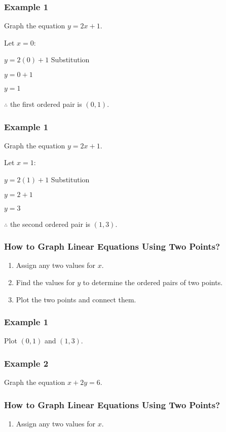 \documentclass[14pt]{beamer}
\begin{document}
    \begin{frame}
    	\frametitle{Example 1}
    	Graph the equation $ y = 2x + 1 $.
    	
    	\vone Let $ x = 0: $
    	
    	\vone \pause $ y = 2(0) + 1 $ \pause \void Substitution
    	
    	\pause \vone $ y = 0 + 1 $
    	
    	\pause \vone $ y = 1 $
    	
    	\pause \vone $ \therefore $ the first ordered pair is $ (0, 1) $.
    \end{frame}

    \begin{frame}
    	\frametitle{Example 1}
    	Graph the equation $ y = 2x + 1 $.
    	
    	\vone Let $ x = 1: $
    	
    	\vone \pause $ y = 2(1) + 1 $ \pause \void Substitution
    	
    	\pause \vone $ y = 2 + 1 $
    	
    	\pause \vone $ y = 3 $
    	
    	\pause \vone $ \therefore $ the second ordered pair is $ (1, 3) $.
    \end{frame}

   \begin{frame}
   	\frametitle{How to Graph Linear Equations Using Two Points?}
   	\begin{enumerate}  
   		\item Assign any two values for $ x $.
   		\item Find the values for $ y $ to determine the ordered pairs of two points.
   		\item Plot the two points and connect them.
   	\end{enumerate}  
   \end{frame}

    \begin{frame}
    	\frametitle{Example 1}
    	Plot $ (0, 1) $ and $ (1, 3) $.
    \end{frame}

    \begin{frame}
    	\frametitle{Example 2}
    	Graph the equation $ x + 2y = 6 $.
    \end{frame}
    
    \begin{frame}
    	\frametitle{How to Graph Linear Equations Using Two Points?}
    	\begin{enumerate}  
    		\item Assign any two values for $ x $.
    	\end{enumerate}  
    \end{frame}
    
\end{document}
